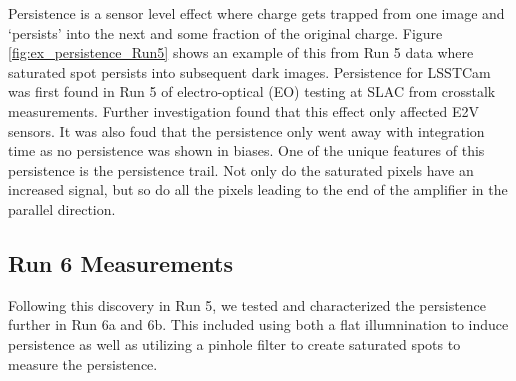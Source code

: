 \documentclass[DM,authoryear,toc]{lsstdoc}
\begin{document}
Persistence is a sensor level effect where charge gets trapped from one image and `persists' into the next and some fraction of the original charge. 
Figure \ref{fig:ex_persistence_Run5} shows an example of this from Run 5 data where saturated spot persists into subsequent dark images. 
Persistence for LSSTCam was first found in Run 5 of electro-optical (EO) testing at SLAC from crosstalk measurements. 
Further investigation found that this effect only affected E2V sensors. 
It was also foud that the persistence only went away with integration time as no persistence was shown in biases. 
One of the unique features of this persistence is the persistence trail. 
Not only do the saturated pixels have an increased signal, but so do all the pixels leading to the end of the amplifier in the parallel direction.

\subsection{Run 6 Measurements}
Following this discovery in Run 5, we tested and characterized the persistence further in Run 6a and 6b. 
This included using both a flat illumnination to induce persistence as well as utilizing a pinhole filter to create saturated spots to measure the persistence.
\end{document}
